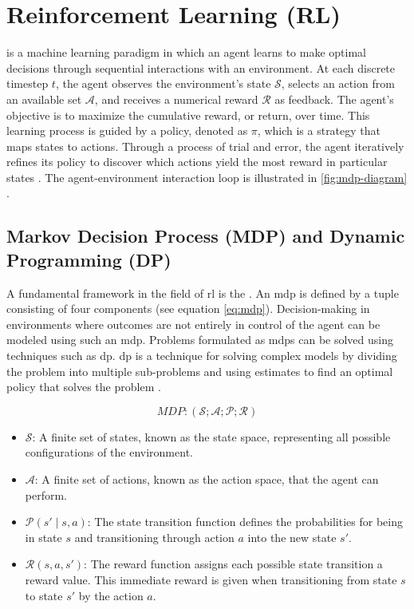 \section{Reinforcement Learning (RL)}\label{sec:background-reinforcement_learning}
 is a machine learning paradigm in which an agent learns to make optimal decisions through sequential interactions with an environment.
At each discrete timestep $t$, the agent observes the environment's state $\mathcal{S}$, selects an action from an available set $\mathcal{A}$, and receives a numerical reward $\mathcal{R}$ as feedback.
The agent's objective is to maximize the cumulative reward, or return, over time.
This learning process is guided by a policy, denoted as $\pi$, which is a strategy that maps states to actions.
Through a process of trial and error, the agent iteratively refines its policy to discover which actions yield the most reward in particular states \cite{sutton_reinforcement_2018, zhang_dive_2023}.
The agent-environment interaction loop is illustrated in \autoref{fig:mdp-diagram} \cite{sutton_reinforcement_2018}.

\subsection{Markov Decision Process (MDP) and Dynamic Programming (DP)}\label{sec:background-reinforcement_learning-mdp}
A fundamental framework in the field of \gls{rl} is the .
An \gls{mdp} is defined by a tuple consisting of four components (see equation \ref{eq:mdp}).
Decision-making in environments where outcomes are not entirely in control of the agent can be modeled using such an \gls{mdp}.
Problems formulated as \glspl{mdp} can be solved using techniques such as \gls{dp}.
\gls{dp} is a technique for solving complex models by dividing the problem into multiple sub-problems and using estimates to find an optimal policy that solves the problem \cite{sutton_reinforcement_2018, zhang_dive_2023}.

\begin{equation}\label{eq:mdp}
    MDP : (\mathcal{S}; \mathcal{A}; \mathcal{P}; \mathcal{R})
\end{equation}

\begin{itemize}
    \item $\mathcal{S}$: A finite set of states, known as the state space, representing all possible configurations of the environment.
    \item $\mathcal{A}$: A finite set of actions, known as the action space, that the agent can perform.
    \item $\mathcal{P}(s' \mid s, a)$: The state transition function defines the probabilities for being in state $s$ and transitioning through action $a$ into the new state $s'$.
    \item $\mathcal{R}(s, a, s')$: The reward function assigns each possible state transition a reward value. This immediate reward is given when transitioning from state $s$ to state $s'$ by the action $a$.
\end{itemize}

